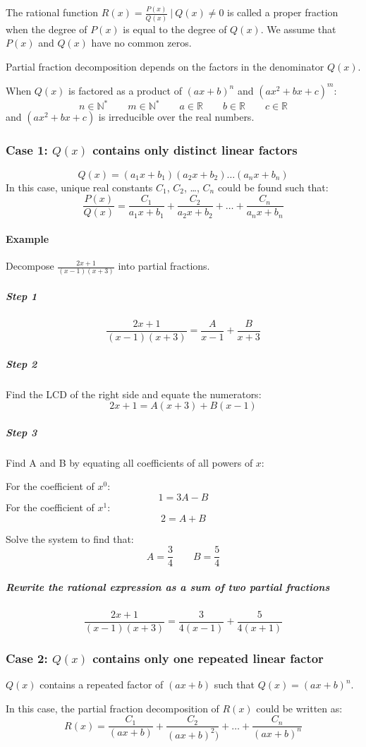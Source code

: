 			The rational function $R(x) = \frac{P(x)}{Q(x)}\ |\ Q(x) \neq 0$ is called a proper fraction when the degree of $P(x)$ is equal to the degree of $Q(x)$. We assume that $P(x)$ and $Q(x)$ have no common zeros.

			Partial fraction decomposition depends on the factors in the denominator $Q(x)$. 
			
			When $Q(x)$ is factored as a product of $(ax+b)^n$ and $(ax^2+bx+c)^m$:
			\[n \in \mathbb{N^*} \qquad m \in \mathbb{N^*} \qquad a \in \mathbb{R} \qquad b \in \mathbb{R} \qquad c \in \mathbb{R}\]
			and $(ax^2+bx+c)$ is irreducible over the real numbers.
			\newpage
			\subsubsection{Case 1: $Q(x)$ contains only distinct linear factors}
				\[Q(x) = (a_1x+b_1)(a_2x+b_2)\dots(a_nx+b_n)\]
				In this case, unique real constants $C_1$, $C_2$, \dots , $C_n$ could be found such that:
				\[\frac{P(x)}{Q(x)} = \frac{C_1}{a_1x+b_1} + \frac{C_2}{a_2x+b_2} + \dots + \frac{C_n}{a_nx+b_n}\]
				\paragraph{Example}
					Decompose $\frac{2x+1}{(x-1)(x+3)}$ into partial fractions.
					\subparagraph{Step 1}
						\[\frac{2x+1}{(x-1)(x+3)} = \frac{A}{x-1} + \frac{B}{x+3}\]
					\subparagraph{Step 2}
						Find the LCD of the right side and equate the numerators:
						\[2x+1 = A(x+3) + B(x-1)\]
					\subparagraph{Step 3}
						Find A and B by equating all coefficients of all powers of $x$:

						For the coefficient of $x^0$:
						\[1 = 3A - B\]
						For the coefficient of $x^1$:
						\[2 = A + B\]

						Solve the system to find that:
						\[A = \frac{3}{4} \qquad B = \frac{5}{4}\]
					\subparagraph{Rewrite the rational expression as a sum of two partial fractions}
						\[\frac{2x+1}{(x-1)(x+3)} = \frac{3}{4(x-1)} + \frac{5}{4(x+1)}\]
			\newpage
			\subsubsection{Case 2: $Q(x)$ contains only one repeated linear factor}
				$Q(x)$ contains a repeated factor of $(ax+b)$ such that $Q(x) = (ax+b)^n$.

				In this case, the partial fraction decomposition of $R(x)$ could be written as:
				\[R(x) = \frac{C_1}{(ax+b)} + \frac{C_2}{(ax+b)^2)} + \dots + \frac{C_n}{(ax+b)^n}\]
